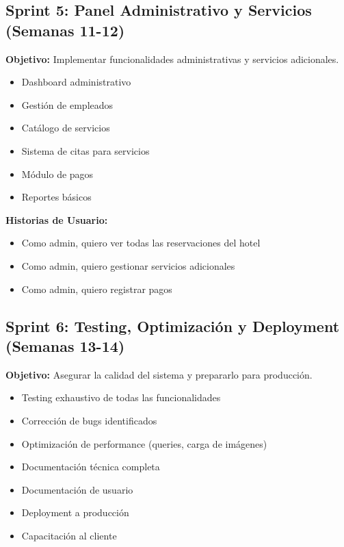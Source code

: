 \subsection{Sprint 5: Panel Administrativo y Servicios (Semanas 11-12)}

\textbf{Objetivo:} Implementar funcionalidades administrativas y servicios adicionales.

\begin{itemize}
    \item Dashboard administrativo
    \item Gestión de empleados
    \item Catálogo de servicios
    \item Sistema de citas para servicios
    \item Módulo de pagos
    \item Reportes básicos
\end{itemize}

\textbf{Historias de Usuario:}
\begin{itemize}
    \item Como admin, quiero ver todas las reservaciones del hotel
    \item Como admin, quiero gestionar servicios adicionales
    \item Como admin, quiero registrar pagos
\end{itemize}

\subsection{Sprint 6: Testing, Optimización y Deployment (Semanas 13-14)}

\textbf{Objetivo:} Asegurar la calidad del sistema y prepararlo para producción.

\begin{itemize}
    \item Testing exhaustivo de todas las funcionalidades
    \item Corrección de bugs identificados
    \item Optimización de performance (queries, carga de imágenes)
    \item Documentación técnica completa
    \item Documentación de usuario
    \item Deployment a producción
    \item Capacitación al cliente
\end{itemize}

